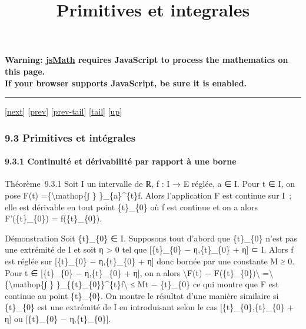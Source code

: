 \documentclass[]{article}
\title{Primitives et integrales}
\author{}
\date{}
\begin{document}
\maketitle

\textbf{Warning: \href{http://www.math.union.edu/locate/jsMath}{jsMath}
requires JavaScript to process the mathematics on this page.\\ If your
browser supports JavaScript, be sure it is enabled.}

\begin{center}\rule{3in}{0.4pt}\end{center}

{[}\href{coursse53.html}{next}{]} {[}\href{coursse51.html}{prev}{]}
{[}\href{coursse51.html\#tailcoursse51.html}{prev-tail}{]}
{[}\hyperref[tailcoursse52.html]{tail}{]}
{[}\href{coursch10.html\#coursse52.html}{up}{]}

\subsubsection{9.3 Primitives et intégrales}

\paragraph{9.3.1 Continuité et dérivabilité par rapport à une borne}

Théorème~9.3.1 Soit I un intervalle de ℝ, f : I → E réglée, a ∈ I. Pour
t ∈ I, on pose F(t) =\{\textbackslash{}mathop\{∫ \} \}\_\{a\}\^{}\{t\}f.
Alors l'application F est continue sur I~; elle est dérivable en tout
point \{t\}\_\{0\} où f est continue et on a alors F'(\{t\}\_\{0\}) =
f(\{t\}\_\{0\}).

Démonstration Soit \{t\}\_\{0\} ∈ I. Supposons tout d'abord que
\{t\}\_\{0\} n'est pas une extrémité de I et soit η \textgreater{} 0 tel
que {[}\{t\}\_\{0\} − η,\{t\}\_\{0\} + η{]} ⊂ I. Alors f est réglée sur
{[}\{t\}\_\{0\} − η,\{t\}\_\{0\} + η{]} donc bornée par une constante M
≥ 0. Pour t ∈ {[}\{t\}\_\{0\} − η,\{t\}\_\{0\} + η{]}, on a alors
\textbackslash{}\textbar{}F(t) −
F(\{t\}\_\{0\})\textbackslash{}\textbar{}
=\textbackslash{}\textbar{}\{\textbackslash{}mathop\{∫ \}
\}\_\{\{t\}\_\{0\}\}\^{}\{t\}f\textbackslash{}\textbar{} ≤ M\textbar{}t
− \{t\}\_\{0\}\textbar{} ce qui montre que F est continue au point
\{t\}\_\{0\}. On montre le résultat d'une manière similaire si
\{t\}\_\{0\} est une extrémité de I en introduisant selon le cas
{[}\{t\}\_\{0\},\{t\}\_\{0\} + η{]} ou {[}\{t\}\_\{0\} −
η,\{t\}\_\{0\}{]}.
\end{document}
